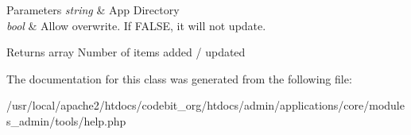 \begin{DoxyParams}{Parameters}
{\em string} & App Directory \\
\hline
{\em bool} & Allow overwrite. If F\-A\-L\-S\-E, it will not update. \\
\hline
\end{DoxyParams}
\begin{DoxyReturn}{Returns}
array Number of items added / updated 
\end{DoxyReturn}


The documentation for this class was generated from the following file\-:\begin{DoxyCompactItemize}
\item 
/usr/local/apache2/htdocs/codebit\-\_\-org/htdocs/admin/applications/core/modules\-\_\-admin/tools/help.\-php\end{DoxyCompactItemize}
